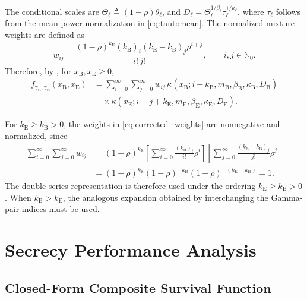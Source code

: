 \documentclass[lettersize,journal]{IEEEtran}
\begin{document}
The conditional scales are \(\Theta_\ell\triangleq(1-\rho)\theta_\ell\), and \(D_\ell=\Theta_\ell^{1/\beta_\ell}\tau_\ell^{1/\kappa_\ell}\).
where \(\tau_\ell\) follows from the mean-power normalization in
\eqref{eq:tautomean}. The normalized mixture weights are defined as
\begin{equation}
w_{ij}
=
\frac{(1-\rho)^{k_{\mathrm E}}
(k_{\mathrm B})_i
(k_{\mathrm E}-k_{\mathrm B})_j
\rho^{i+j}}
{i!\,j!},
\qquad i,j\in\mathbb N_0.
\label{eq:corrected_weights}
\end{equation}
Therefore, by \cite[eq. (3)]{5281755}, for \(x_{\mathrm B},x_{\mathrm E}\geq0\),
\begin{equation}
\begin{aligned}
f_{\gamma_{\mathrm B},\gamma_{\mathrm E}}
(x_{\mathrm B},x_{\mathrm E})
&=\sum_{i=0}^{\infty}\sum_{j=0}^{\infty} w_{ij}\,
\kappa(x_{\mathrm B};i+k_{\mathrm B},m_{\mathrm B},
\beta_{\mathrm B},\kappa_{\mathrm B},D_{\mathrm B})\\
&\quad\times
\kappa(x_{\mathrm E};i+j+k_{\mathrm E},m_{\mathrm E},
\beta_{\mathrm E},\kappa_{\mathrm E},D_{\mathrm E}).
\end{aligned}
\label{eq:jointgggg}
\end{equation}

For \(k_{\mathrm E}\geq k_{\mathrm B}>0\), the weights in \eqref{eq:corrected_weights} are nonnegative and normalized, since
\begin{equation}
\begin{aligned}
\sum_{i=0}^{\infty}\sum_{j=0}^{\infty}w_{ij}
&=(1-\rho)^{k_{\mathrm E}}
\left[\sum_{i=0}^{\infty}
\frac{(k_{\mathrm B})_i}{i!}\rho^i\right]
\left[\sum_{j=0}^{\infty}
\frac{(k_{\mathrm E}-k_{\mathrm B})_j}{j!}\rho^j\right]\\
&=(1-\rho)^{k_{\mathrm E}}
(1-\rho)^{-k_{\mathrm B}}
(1-\rho)^{-(k_{\mathrm E}-k_{\mathrm B})}
=1.
\end{aligned}
\label{eq:weights_normalization}
\end{equation}
The double-series representation is therefore used under the ordering
\(k_{\mathrm E}\geq k_{\mathrm B}>0\). When \(k_{\mathrm B}>k_{\mathrm E}\), the analogous expansion obtained by interchanging the Gamma-pair indices must be used.


\section{Secrecy Performance Analysis}
\label{sec:secrecy_performance}

\subsection{Closed-Form Composite Survival Function}
\end{document}
